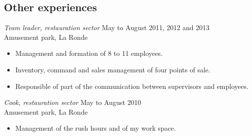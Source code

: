 \documentclass{res}
\newcommand{\inFrench}[1]{}
\newcommand{\inEnglish}[1]{#1}
\begin{document}
\begin{resume}
\inFrench{
	\section{Expériences connexes}
}
\inEnglish{
	\section{Other experiences}
}
\vspace{6pt}

\inFrench{
	{\sl Chef d'équipe, secteur restauration}
		\hfill mai à août 2011, 2012 et 2013 \\
	Parc d'attractions La Ronde

	\vspace{0.05in}
	\begin{itemize} \itemsep -2pt
		\item Gestion et formation continue de 8 à 11 personnes;
		\item Gestion des inventaires, des commandes et du fonctionnement de quatre points de vente;
		\item Responsable d’une partie de la communication entre les superviseurs et les préposés;
		\item Formation des nouveaux employés.
	\end{itemize}


	{\sl Cuisinier, secteur restauration}
		\hfill mai à août 2010 \\
	Parc d'attractions La Ronde

	\vspace{0.05in}
	\begin{itemize} \itemsep -2pt
		\item Gestion des périodes d’achalandages et de mon espace de travail.
	\end{itemize}
}

\inEnglish{
	{\sl Team leader, restauration sector}
		\hfill May to August 2011, 2012 and 2013 \\
	Amusement park, La Ronde

	\vspace{0.05in}
	\begin{itemize} \itemsep -2pt
		\item Management and formation of 8 to 11 employees.
		\item Inventory, command and sales management of four points of sale.
		\item Responsible of part of the communication between supervisors and employees.
	\end{itemize}


	{\sl Cook, restauration sector}
		\hfill May to August 2010 \\
	Amusement park, La Ronde

	\vspace{0.05in}
	\begin{itemize} \itemsep -2pt
		\item Management of the rush hours and of my work space.
	\end{itemize}
}

\vspace{0.1in}

\end{resume}
\end{document}
